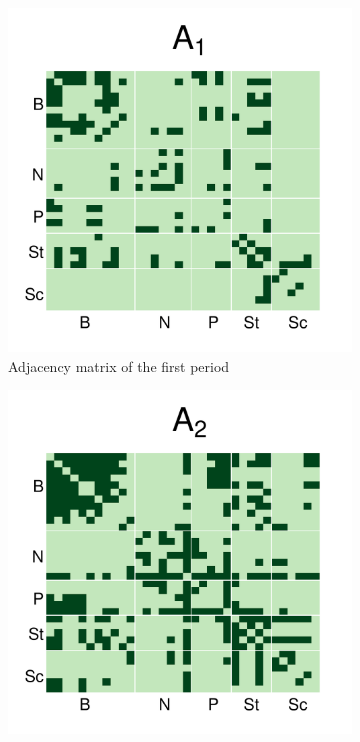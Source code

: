 \documentclass[12pt]{article}
\begin{document}
\begin{figure}[H]
	\centering
	\begin{subfigure}[b]{0.45\textwidth}
		\includegraphics[width=\textwidth]{../../Figure/Adj0.pdf}
		\caption{Adjacency matrix of the first period}
		\label{fig:adj0}
	\end{subfigure}
	\begin{subfigure}[b]{0.45\textwidth}
		\includegraphics[width=\textwidth]{../../Figure/Adj1.pdf}

\end{subfigure}
\end{figure}
\end{document}
